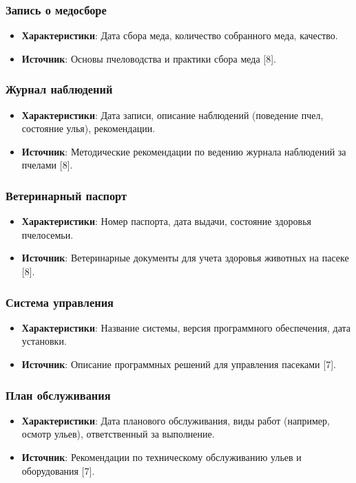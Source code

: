\documentclass{article}
\begin{document}
\subsubsection{Запись о медосборе}
\begin{itemize}
    \item \textbf{Характеристики}: Дата сбора меда, количество собранного меда, качество.
    \item \textbf{Источник}: Основы пчеловодства и практики сбора меда [8].
\end{itemize}

\subsubsection{Журнал наблюдений}
\begin{itemize}
    \item \textbf{Характеристики}: Дата записи, описание наблюдений (поведение пчел, состояние улья), рекомендации.
    \item \textbf{Источник}: Методические рекомендации по ведению журнала наблюдений за пчелами [8].
\end{itemize}

\subsubsection{Ветеринарный паспорт}
\begin{itemize}
    \item \textbf{Характеристики}: Номер паспорта, дата выдачи, состояние здоровья пчелосемьи.
    \item \textbf{Источник}: Ветеринарные документы для учета здоровья животных на пасеке [8].
\end{itemize}

\subsubsection{Система управления}
\begin{itemize}
    \item \textbf{Характеристики}: Название системы, версия программного обеспечения, дата установки.
    \item \textbf{Источник}: Описание программных решений для управления пасеками [7].
\end{itemize}

\subsubsection{План обслуживания}
\begin{itemize}
    \item \textbf{Характеристики}: Дата планового обслуживания, виды работ (например, осмотр ульев), ответственный за выполнение.
    \item \textbf{Источник}: Рекомендации по техническому обслуживанию ульев и оборудования [7].
\end{itemize}
\end{document}
